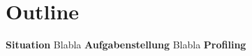 \section*{Outline}

\textbf{Situation}
Blabla
\newline
\textbf{Aufgabenstellung}
Blabla
\newline
\textbf{Profiling}
